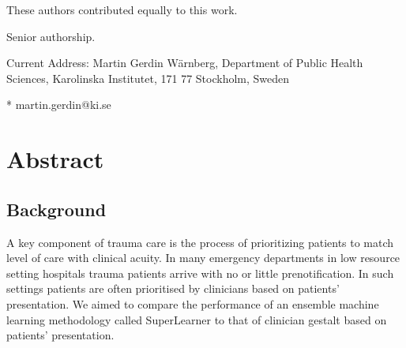 \documentclass[10pt,letterpaper]{article}\usepackage[]{graphicx}\usepackage[]{color}
\begin{document}
\begin{flushleft}
% 
%
\Yinyang These authors contributed equally to this work.

\ddag Senior authorship.

\textcurrency Current Address: Martin Gerdin Wärnberg, Department of Public
Health Sciences, Karolinska Institutet, 171 77 Stockholm, Sweden




* martin.gerdin@ki.se

\end{flushleft}
\section*{Abstract}
\subsection*{Background}
A key component of trauma care is the process of prioritizing patients to match
level of care with clinical acuity. In many emergency departments in low
resource setting hospitals trauma patients arrive with no or little
prenotification. In such settings patients are often prioritised by clinicians
based on patients' presentation. We aimed to compare the performance of an
ensemble machine learning methodology called SuperLearner to that of clinician
gestalt based on patients’ presentation.
\end{document}
